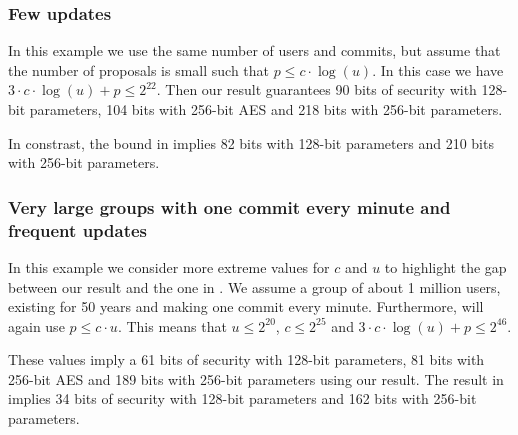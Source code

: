\subsubsection{Few updates}

In this example we use the same number of users and commits, but assume that the number of proposals is small such that $p \le c \cdot \log(u)$. In this case we have $3 \cdot c \cdot \log(u) + p \le 2^{22}$. Then our result guarantees 90 bits of security with 128-bit parameters, 104 bits with 256-bit AES and 218 bits with 256-bit parameters.

In constrast, the bound in \cite{ttkem} implies 82 bits with 128-bit parameters and 210 bits with 256-bit parameters.

\subsubsection{Very large groups with one commit every minute and frequent updates} In this example we consider more extreme values for $c$ and $u$ to highlight the gap between our result and the one in \cite{ttkem}. We assume a group of about 1 million users, existing for 50 years and making one commit every minute. Furthermore, will again use $p \le c \cdot u$. This means that $u \le 2^{20}$, $c \le 2^{25}$ and $3 \cdot c \cdot \log(u) + p \le 2^{46}$.

These values imply a 61 bits of security with 128-bit parameters, 81 bits with 256-bit AES and 189 bits with 256-bit parameters using our result. The result in \cite{ttkem} implies 34 bits of security with 128-bit parameters and 162 bits with 256-bit parameters.
